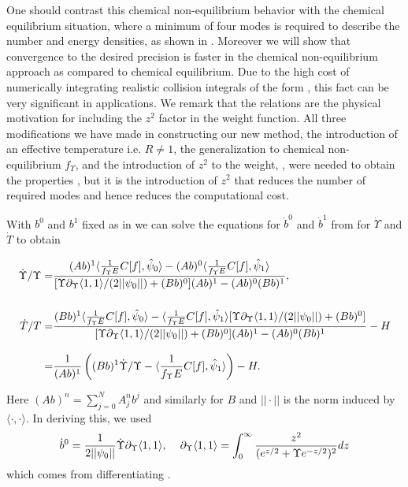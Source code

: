 One should contrast this chemical non-equilibrium behavior  with the chemical equilibrium situation, where a minimum of four modes is required to describe the number and energy densities, as shown in .   Moreover we will show that convergence to the desired precision is faster in the chemical non-equilibrium approach as compared to chemical equilibrium. Due to the high cost of numerically integrating realistic collision integrals of the form , this fact can be very significant in applications. We remark that the relations  are the physical motivation for including the $z^2$ factor in the weight function. All three modifications we have made in constructing our new method, the introduction of an effective temperature i.e. $R\ne 1$, the generalization to chemical non-equilibrium $f_\Upsilon $, and the introduction of $z^2$ to the weight, , were needed to obtain the properties , but it is the introduction of $z^2$ that reduces the number of required modes and hence reduces the computational cost. 

With $b^0$ and $b^1$ fixed as in  we can solve the equations for $\dot b^0$ and $\dot b^1$ from  for $\dot\Upsilon$ and $\dot T$ to obtain

\begin{align}\label{Ups_T_eqs}
\dot{\Upsilon}/{\Upsilon}=&\frac{(Ab)^1\langle\frac{1}{f_\Upsilon E}C[f],\hat\psi_0\rangle-(Ab)^0\langle\frac{1}{f_\Upsilon E}C[f],\hat\psi_1\rangle }{[\Upsilon\partial_\Upsilon \langle1,1\rangle/(2||\psi_0||)+(Bb)^0](Ab)^1-(Ab)^0(Bb)^1},\\[0.5cm]
\dot{T}/T
=&\frac{(Bb)^1\langle\frac{1}{f_\Upsilon E}C[f],\hat\psi_0\rangle-\langle\frac{1}{f_\Upsilon E}C[f],\hat\psi_1\rangle[\Upsilon\partial_\Upsilon \langle1,1\rangle/(2||\psi_0||)+(Bb)^0]}{[\Upsilon\partial_\Upsilon \langle1,1\rangle/(2||\psi_0||)+(Bb)^0](Ab)^1-(Ab)^0(Bb)^1}-H\notag\\[0.3cm]
=&\frac{1}{(Ab)^1}\left((Bb)^1\dot{\Upsilon}/\Upsilon-\langle\frac{1}{f_\Upsilon E}C[f],\hat\psi_1\rangle\right)-H.\label{T_eq}
\end{align}

Here $(Ab)^n=\sum_{j=0}^NA^n_jb^j$ and similarly for $B$ and $||\cdot||$ is the norm induced by $\langle\cdot,\cdot\rangle$. In deriving this, we used
\begin{equation}
\dot{b}^0=\frac{1}{2||\psi_0||}\dot\Upsilon\partial_\Upsilon \langle1,1\rangle, \hspace{4mm} \partial_\Upsilon \langle1,1\rangle=\int_0^\infty \frac{z^2}{(e^{z/2}+ \Upsilon e^{-z/2})^2}dz
\end{equation}
which comes from differentiating . 
 

